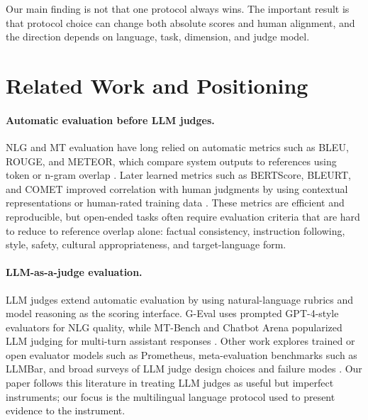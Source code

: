 \documentclass{article}
\begin{document}
Our main finding is not that one protocol always wins. The important result is that protocol choice can change both absolute scores and human alignment, and the direction depends on language, task, dimension, and judge model.

\section{Related Work and Positioning}

\paragraph{Automatic evaluation before LLM judges.}
NLG and MT evaluation have long relied on automatic metrics such as BLEU, ROUGE, and METEOR, which compare system outputs to references using token or n-gram overlap \citep{papineni2002bleu,lin2004rouge,banerjee2005meteor}. Later learned metrics such as BERTScore, BLEURT, and COMET improved correlation with human judgments by using contextual representations or human-rated training data \citep{zhang2020bertscore,sellam2020bleurt,rei2020comet}. These metrics are efficient and reproducible, but open-ended tasks often require evaluation criteria that are hard to reduce to reference overlap alone: factual consistency, instruction following, style, safety, cultural appropriateness, and target-language form.

\paragraph{LLM-as-a-judge evaluation.}
LLM judges extend automatic evaluation by using natural-language rubrics and model reasoning as the scoring interface. G-Eval uses prompted GPT-4-style evaluators for NLG quality, while MT-Bench and Chatbot Arena popularized LLM judging for multi-turn assistant responses \citep{liu2023geval,zheng2023judging}. Other work explores trained or open evaluator models such as Prometheus, meta-evaluation benchmarks such as LLMBar, and broad surveys of LLM judge design choices and failure modes \citep{kim2023prometheus,zeng2023evaluating,li2024llmsjudgesurvey}. Our paper follows this literature in treating LLM judges as useful but imperfect instruments; our focus is the multilingual language protocol used to present evidence to the instrument.
\end{document}

